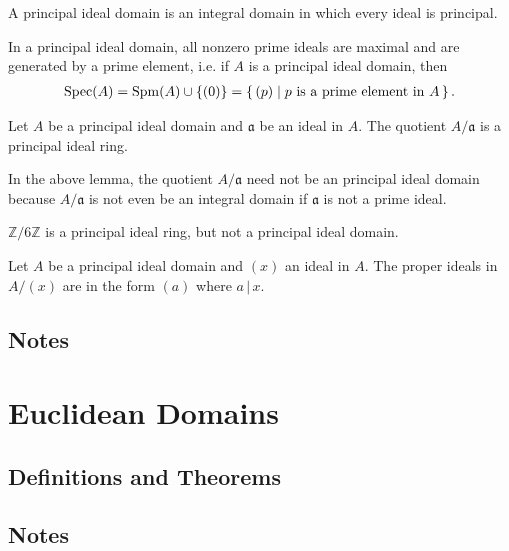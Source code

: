 \begin{defbox}
    \begin{definition}
        A principal ideal domain is an integral domain in which every ideal is principal.
    \end{definition}
\end{defbox}

\begin{thmbox}
    \begin{lemma}
        In a principal ideal domain, all nonzero prime ideals are maximal and are generated by a prime element, i.e. if \(A\) is a principal ideal domain, then
        \begin{align*}
            \mathrm{Spec}(A) = \mathrm{Spm}(A) \cup \{(0)\} = \left\{\, (p) \mid p \text{ is a prime element in } A \,\right\} \text{.}
        \end{align*}
    \end{lemma}
\end{thmbox}

\begin{thmbox}
    \begin{lemma}
        Let \(A\) be a principal ideal domain and \(\mathfrak{a}\) be an ideal in \(A\). The quotient \(A/\mathfrak{a}\) is a principal ideal ring.
    \end{lemma}
\end{thmbox}

\begin{rembox}
    \begin{remark}
        In the above lemma, the quotient \(A / \mathfrak{a}\) need not be an principal ideal domain because \(A / \mathfrak{a}\) is not even be an integral domain if \(\mathfrak{a}\) is not a prime ideal.
    \end{remark}
\end{rembox}

\begin{exmbox}
    \begin{example}
        \(\mathbb{Z}/6\mathbb{Z}\) is a principal ideal ring, but not a principal ideal domain.
    \end{example}
\end{exmbox}

\begin{thmbox}
    \begin{proposition}
        Let \(A\) be a principal ideal domain and \((x)\) an ideal in \(A\). The proper ideals in \(A / (x)\) are in the form \((a)\) where \(a \, | \, x\). 
    \end{proposition}
\end{thmbox}

\subsection*{Notes}

\newpage
\section{Euclidean Domains}
\subsection*{Definitions and Theorems}
\subsection*{Notes}
